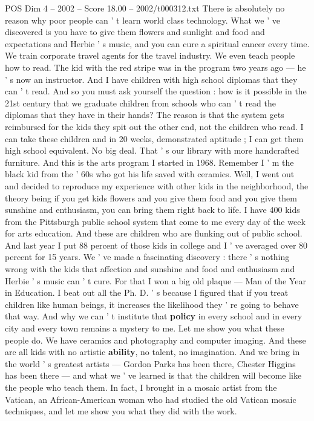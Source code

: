 \begin{textsample}{POS Dim 4 – 2002 – Score 18.00 – 2002/t000312.txt}
There is absolutely no reason why poor people can ' t learn world class technology.
What we ' ve discovered is you have to give them flowers and sunlight and food and expectations and Herbie ' s music, and you can cure a spiritual cancer every time.
We train corporate travel agents for the travel industry.
We even teach people how to read.
The kid with the red stripe was in the program two years ago — he ' s now an instructor.
And I have children with high school diplomas that they can ' t read.
And so you must ask yourself the question : how is it possible in the 21st century that we graduate children from schools who can ' t read the diplomas that they have in their hands?
The reason is that the system gets reimbursed for the kids they spit out the other end, not the children who read.
I can take these children and in 20 weeks, demonstrated aptitude ; I can get them high school equivalent.
No big deal.
That ' s our library with more handcrafted furniture.
And this is the arts program I started in 1968.
Remember I ' m the black kid from the ' 60s who got his life saved with ceramics.
Well, I went out and decided to reproduce my experience with other kids in the neighborhood, the theory being if you get kids flowers and you give them food and you give them sunshine and enthusiasm, you can bring them right back to life.
I have 400 kids from the Pittsburgh public school system that come to me every day of the week for arts education.
And these are children who are flunking out of public school.
And last year I put 88 percent of those kids in college and I ' ve averaged over 80 percent for 15 years.
We ' ve made a fascinating discovery : there ' s nothing wrong with the kids that affection and sunshine and food and enthusiasm and Herbie ' s music can ' t cure.
For that I won a big old plaque — Man of the Year in Education.
I beat out all the Ph.
D. ' s because I figured that if you treat children like human beings, it increases the likelihood they ' re going to behave that way.
And why we can ' t institute that \textbf{policy} in every school and in every city and every town remains a mystery to me.
Let me show you what these people do.
We have ceramics and photography and computer imaging.
And these are all kids with no artistic \textbf{ability}, no talent, no imagination.
And we bring in the world ' s greatest artists — Gordon Parks has been there, Chester Higgins has been there — and what we ' ve learned is that the children will become like the people who teach them.
In fact, I brought in a mosaic artist from the Vatican, an African-American woman who had studied the old Vatican mosaic techniques, and let me show you what they did with the work.

\end{textsample}
